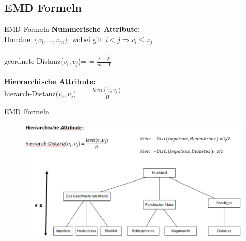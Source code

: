 \subsection{EMD Formeln} 
\begin{frame}{EMD Formeln}
	\textbf{Nummerische Attribute:} \\
	Domäne: $\{v_i,...,v_m\}$, wobei gilt $i<j \Rightarrow v_i \le v_j$\\
	\ \\
	geordnete-Distanz($v_i,v_j$)= = $\frac{|i-j|}{m-1}$
	\ \\
	\ \\
	\textbf{Hierrarchische Attribute:} \\
	hierarch-Distanz($v_i,v_j$)= = $\frac{level(v_i,v_j)}{H}$
\end{frame}
\begin{frame}{EMD Formeln}
	\begin{figure}
		\includegraphics[scale=0.45]{pic/EMD_Formel.png}
	\end{figure}
\end{frame}
